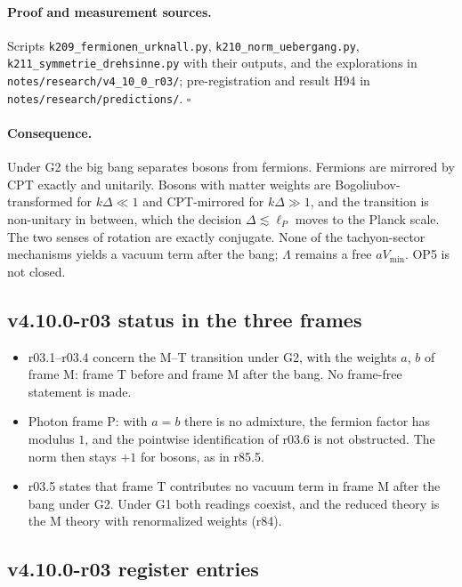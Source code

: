 \paragraph{Proof and measurement sources.}
Scripts \texttt{k209\_\allowbreak fermionen\_\allowbreak urknall.py}, \texttt{k210\_\allowbreak norm\_\allowbreak uebergang.py},
\texttt{k211\_\allowbreak symmetrie\_\allowbreak drehsinne.py} with their outputs, and the explorations in \texttt{notes/\allowbreak research/\allowbreak v4\_10\_0\_r03/};
pre-registration and result H94 in \texttt{notes/\allowbreak research/\allowbreak predictions/}.  \(\square\)

\paragraph{Consequence.}
Under G2 the big bang separates bosons from fermions.  Fermions are mirrored by CPT exactly and unitarily.  Bosons with matter weights are
Bogoliubov-transformed for \(k\Delta\ll1\) and CPT-mirrored for \(k\Delta\gg1\), and the transition is non-unitary in between, which the decision
\(\Delta\lesssim\ell_P\) moves to the Planck scale.  The two senses of rotation are exactly conjugate.  None of the tachyon-sector mechanisms yields a
vacuum term after the bang; \(\Lambda\) remains a free \(aV_{\min}\).  OP5 is not closed.

\subsection*{v4.10.0-r03 status in the three frames}
\label{subsec:v4100-r03-frames}

\begin{itemize}[leftmargin=2em]
\item r03.1--r03.4 concern the M--T transition under G2, with the weights \(a\), \(b\) of frame M: frame T before and frame M after the bang.  No frame-free
statement is made.
\item Photon frame P: with \(a=b\) there is no admixture, the fermion factor has modulus \(1\), and the pointwise identification of r03.6 is not obstructed.
The norm then stays \(+1\) for bosons, as in r85.5.
\item r03.5 states that frame T contributes no vacuum term in frame M after the bang under G2.  Under G1 both readings coexist, and the reduced theory is
the M theory with renormalized weights (r84).
\end{itemize}

\subsection*{v4.10.0-r03 register entries}
\label{subsec:v4100-r03-register}

